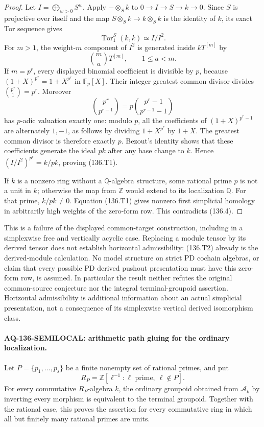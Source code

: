 \begin{proof}
Let $I=\bigoplus_{w>0}S^w$. Apply $-\otimes_S k$ to
$0\to I\to S\to k\to0$. Since $S$ is projective over
itself and the map $S\otimes_S k\to k\otimes_S k$ is
the identity of $k$, its exact Tor sequence gives
\[
                         \operatorname{Tor}_1^S(k,k)
                           \simeq I/I^2.
\]
For $m>1$, the weight-$m$ component of $I^2$ is generated
inside $kT^{[m]}$ by
\[
              \binom ma T^{[m]},\qquad 1\leq a<m.
\]
If $m=p^r$, every displayed binomial coefficient is divisible
by $p$, because $(1+X)^{p^r}=1+X^{p^r}$ in $\mathbb F_p[X]$.
Their integer greatest common divisor divides
$\binom{p^r}{1}=p^r$. Moreover
\[
 \binom{p^r}{p^{r-1}}
   =p\binom{p^r-1}{p^{r-1}-1}
\]
has $p$-adic valuation exactly one: modulo $p$, all the
coefficients of $(1+X)^{p^r-1}$ are alternately $1,-1$,
as follows by dividing $1+X^{p^r}$ by $1+X$.
The greatest common divisor is therefore exactly $p$.
Bezout's identity shows that these coefficients generate
the ideal $pk$ after any base change to $k$. Hence
$(I/I^2)^{p^r}=k/pk$, proving (136.T1).

If $k$ is a nonzero ring without a $\mathbb Q$-algebra
structure, some rational prime $p$ is not a unit in $k$;
otherwise the map from $\mathbb Z$ would extend to its
localization $\mathbb Q$. For that prime, $k/pk\ne0$.
Equation (136.T1) gives nonzero first simplicial homology
in arbitrarily high weights of the zero-form row. This
contradicts (136.4). \qedhere
\end{proof}

This is a failure of the displayed common-target construction,
including in a simplexwise free and vertically acyclic case.
Replacing a module tensor by its derived tensor does not
establish horizontal admissibility: (136.T2) already is the
derived-module calculation. No model structure on strict PD
cochain algebras, or claim that every possible PD derived
pushout presentation must have this zero-form row, is assumed.
In particular the result neither refutes the original
common-source conjecture nor the integral terminal-groupoid
assertion. Horizontal admissibility is additional information
about an actual simplicial presentation, not a consequence
of its simplexwise vertical derived isomorphism class.


\paragraph{AQ-136-SEMILOCAL: arithmetic path gluing for the ordinary localization.}
Let $P=\{p_1,\ldots,p_s\}$ be a finite nonempty set of rational
primes, and put
\[
 R_P=\mathbb Z[\ell^{-1}:\ell\text{ prime},\ \ell\notin P].
\]
For every commutative $R_P$-algebra $k$, the ordinary groupoid
obtained from $\mathcal A_k$ by inverting every morphism is
equivalent to the terminal groupoid. Together with the rational
case, this proves the assertion for every commutative ring in
which all but finitely many rational primes are units.

